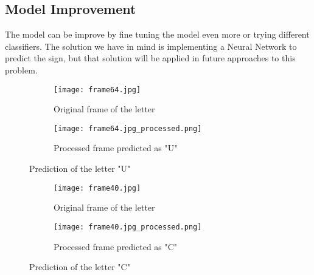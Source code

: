 \documentclass[9pt,a4paper,twoside]{tau-class/tau}
\begin{document}
        \subsection{Model Improvement}
            The model can be improve by fine tuning the model even more or trying different classifiers. The solution we have in mind is implementing a Neural Network to predict the sign, but that solution will be applied in future approaches to this problem.
    \begin{figure}[H]
        \centering
        \begin{subfigure}[b]{0.43\linewidth} %
            \texttt{[image: frame64.jpg]} %
            \caption{Original frame of the letter}
            \label{fig:frameu}
        \end{subfigure}
        \hspace{10pt}
        \begin{subfigure}[b]{0.43\linewidth} %
            \texttt{[image: frame64.jpg\_processed.png]}
            \caption{Processed frame predicted as "U"}
            \label{fig:predu}
        \end{subfigure}
        \caption{Prediction of the letter "U"}
        \label{fig:res_u}
    \end{figure}
    \begin{figure}[H]
        \centering
        \begin{subfigure}[b]{0.43\linewidth} %
            \texttt{[image: frame40.jpg]} %
            \caption{Original frame of the letter}
            \label{fig:framec}
        \end{subfigure}
        \hspace{10pt}
        \begin{subfigure}[b]{0.43\linewidth} %
            \texttt{[image: frame40.jpg\_processed.png]}
            \caption{Processed frame predicted as "C"}
            \label{fig:predc}
        \end{subfigure}
        \caption{Prediction of the letter "C"}
        \label{fig:res_c}
    \end{figure}


\printbibliography

\end{document}
